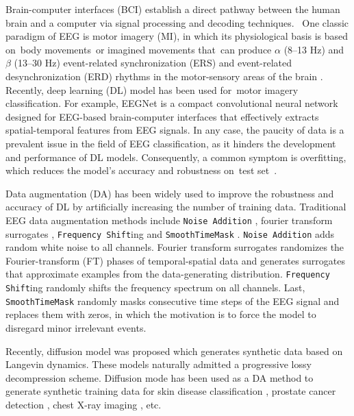 \documentclass[12pt]{iopart}
\begin{document}
Brain-computer interfaces (BCI) establish a direct pathway between the human brain and a computer via signal processing and decoding techniques.  One classic paradigm of EEG is motor imagery (MI), in which its physiological basis is based on body movements or imagined movements that can produce $\alpha$ (8–13 Hz) and $\beta$ (13–30 Hz) event-related synchronization (ERS) and event-related desynchronization (ERD) rhythms in the motor-sensory areas of the brain \cite{wolpaw2013brain}. Recently, deep learning (DL) model has been used for motor imagery classification. For example, EEGNet \cite{lawhern2018eegnet} is a compact convolutional neural network designed for EEG-based brain-computer interfaces that effectively extracts spatial-temporal features from EEG signals. In any case, the paucity of data is a prevalent issue in the field of EEG classification, as it hinders the development and performance of DL models.  Consequently, a common symptom is overfitting, which reduces the model's accuracy and robustness on test set \cite{bilbao2017overfitting}. 

Data augmentation (DA) has been widely used to improve the robustness and accuracy of DL by artificially increasing the number of training data.  Traditional EEG data augmentation methods include \texttt{Noise Addition} \cite{wang2018data,parvan2019transfer,li2019channel}, fourier transform surrogates \cite{schwabedal2018addressing}, \texttt{Frequency Shift}ing \cite{rommel2021cadda,rommel2022data} and \texttt{\texttt{SmoothTimeMask}} \cite{mohsenvand2020contrastive}. 
\texttt{Noise Addition} \cite{li2019channel,parvan2019transfer} adds random white noise to all channels.  Fourier transform surrogates \cite{schwabedal2018addressing} randomizes the Fourier-transform (FT) phases of temporal-spatial data and generates surrogates that approximate examples from the data-generating distribution. \texttt{Frequency Shift}ing \cite{rommel2021cadda,rommel2022data} randomly shifts the frequency spectrum on all channels. Last, \texttt{\texttt{SmoothTimeMask}} \cite{mohsenvand2020contrastive} randomly masks consecutive time steps of the EEG signal and replaces them with zeros, in which the motivation is to force the model to disregard minor irrelevant events.

Recently, diffusion model \cite{ho2020denoising} was proposed which generates synthetic data based on Langevin dynamics. These models naturally admitted a progressive lossy decompression scheme. 
Diffusion mode has been used as a DA method to generate synthetic training data for skin disease classification \cite{akrout2023diffusion}, prostate cancer detection \cite{hao2021comprehensive}, chest X-ray imaging \cite{motamed2021data}, etc.   
\end{document}
